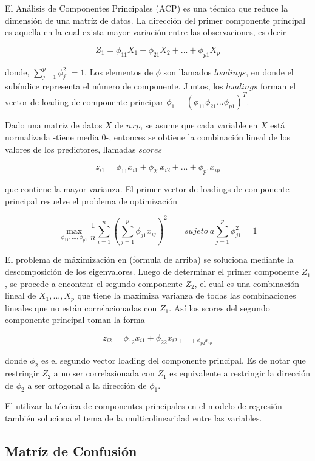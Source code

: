 \documentclass[a4paper,12pt]{Latex/Classes/PhDthesisPSnPDF}
\begin{document}
El Análisis de Componentes Principales (ACP) es una técnica que reduce la dimensión de una matríz de datos. La dirección del primer componente principal es aquella en la cual exista mayor variación entre las observaciones, es decir

$$ Z_{1} = \phi_{11}X_{1} + \phi_{21}X_{2} + ... + \phi_{p1}X_{p} $$

donde, $ \sum_{j=1}^{p} \phi_{j1}^{2} = 1 $. Los elementos de $ \phi $ son llamados $loadings$, en donde el subíndice representa el número de componente. Juntos, los $loadings$ forman el vector de loading de componente principar $\phi_{1} = (\phi_{11} \phi_{21}... \phi_{p1})^T$.

Dado una matriz de datos $X$ de $n x p$, se asume que cada variable en $X$ está normalizada -tiene media 0-, entonces se obtiene la combinación lineal de los valores de los predictores, llamadas $scores$

$$ z_{i1} = \phi_{11} x_{i1} + \phi_{21} x_{i2} + ... + \phi_{p1} x_{ip} $$

que contiene la mayor varianza. El primer vector de loadings de componente principal resuelve el problema de optimización

$$ \max_{\phi_{11}, ..., \phi_{p1}}
\frac{1}{n} \sum_{i = 1}^{n} (\sum_{j=1}^{p} \phi_{j1} x_{ij})^2
\qquad sujeto \ a  \sum_{j=1}^{p} \phi_{j1}^{2} = 1
$$

El problema de máximización en (formula de arriba) se soluciona mediante la descomposición de los eigenvalores. Luego de determinar el primer componente $Z_{1}$, se procede a encontrar el segundo componente $Z_{2}$, el cual es una combinación lineal de $ X_{1}, ..., X_{p} $ que tiene la maximiza varianza de todas las combinaciones lineales que no están correlacionadas con $Z_{1}$. Así los scores del segundo componente principal toman la forma

$$ z_{i2} = \phi_{12}x_{i1} + \phi_{22}x_{i2 + ... + \phi_{p2}x_{ip}} $$

donde $\phi_{2}$ es el segundo vector loading del componente principal. Es de notar que restringir $Z_{2}$ a no ser correlasionada con $Z_{1}$ es equivalente a restringir la dirección de $\phi_{2}$ a ser ortogonal a la dirección de $\phi_{1}$.

El utilizar la técnica de componentes principales en el modelo de regresión también soluciona el tema de la multicolinearidad entre las variables. 

\subsection{Matríz de Confusión}
\end{document}
